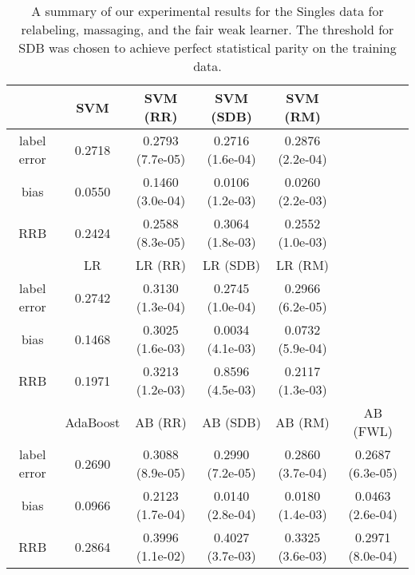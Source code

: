 \clearpage
\begin{table}[h]
\centering
\begin{tabular}{| c | ccccc |}
\hline
               & SVM & SVM (RR) & SVM (SDB) & SVM (RM) & \\
\hline
label error    & 0.2718 & 0.2793 (7.7e-05) & 0.2716 (1.6e-04) & 0.2876 (2.2e-04)& \\
bias           & 0.0550 & 0.1460 (3.0e-04) & 0.0106 (1.2e-03) & 0.0260 (2.2e-03)& \\
RRB            & 0.2424 & 0.2588 (8.3e-05) & 0.3064 (1.8e-03) & 0.2552 (1.0e-03)&\\
\hline
               & LR & LR (RR)  & LR (SDB)  & LR (RM)  &  \\
\hline
label error    & 0.2742 & 0.3130 (1.3e-04) & 0.2745 (1.0e-04) & 0.2966 (6.2e-05)&\\
bias           & 0.1468 & 0.3025 (1.6e-03) & 0.0034 (4.1e-03) & 0.0732 (5.9e-04)&\\
RRB            & 0.1971 & 0.3213 (1.2e-03) & 0.8596 (4.5e-03) & 0.2117 (1.3e-03)& \\
\hline
               & AdaBoost & AB (RR) & AB (SDB) & AB (RM) & AB (FWL)   \\
\hline
label error    & 0.2690 & 0.3088 (8.9e-05) & 0.2990 (7.2e-05) & 0.2860 (3.7e-04) & 0.2687 (6.3e-05)\\
bias           & 0.0966 & 0.2123 (1.7e-04) & 0.0140 (2.8e-04) & 0.0180 (1.4e-03) & 0.0463 (2.6e-04)\\
RRB            & 0.2864 & 0.3996 (1.1e-02) & 0.4027 (3.7e-03) & 0.3325 (3.6e-03) & 0.2971 (8.0e-04)\\
\hline
\hline
\end{tabular}
\caption{A summary of our experimental results for the Singles data for relabeling, massaging, and
the fair weak learner. The threshold for SDB was chosen to achieve perfect
statistical parity on the training data.}
\label{table:singles_results}
\end{table}
